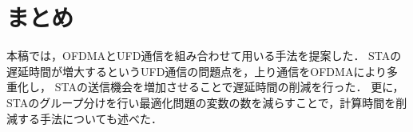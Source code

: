 \documentclass[technicalreport]{ieicej}
\begin{document}
\section{まとめ}
	本稿では，OFDMAとUFD通信を組み合わせて用いる手法を提案した．
	STAの遅延時間が増大するというUFD通信の問題点を，上り通信をOFDMAにより多重化し，
	STAの送信機会を増加させることで遅延時間の削減を行った．
	更に，STAのグループ分けを行い最適化問題の変数の数を減らすことで，計算時間を削減する手法についても述べた．



\end{document}
